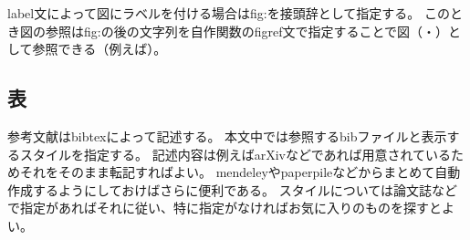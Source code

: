 \documentclass[uplatex]{jsarticle}
\begin{document}
\par
label文によって図にラベルを付ける場合はfig:を接頭辞として指定する。
このとき図の参照はfig:の後の文字列を自作関数のfigref文で指定することで図（・）として参照できる（例えば）。

\subsection{表}





% 
参考文献はbibtexによって記述する。
本文中では参照するbibファイルと表示するスタイルを指定する。
記述内容は例えばarXivなどであれば用意されているためそれをそのまま転記すればよい。
mendeleyやpaperpileなどからまとめて自動作成するようにしておけばさらに便利である。
スタイルについては論文誌などで指定があればそれに従い、特に指定がなければお気に入りのものを探すとよい。
\end{document}
